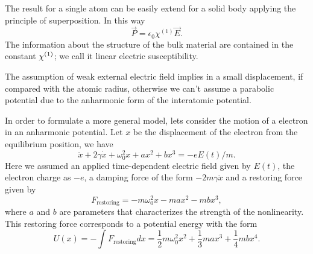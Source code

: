 The result for a single atom can be easily extend for a solid body applying the principle of  superposition. In this way
\begin{equation}
    \vec{P} = \epsilon_0\chi^{(1)}\vec{E}.
\end{equation}
The information about the structure of the bulk material are contained in the constant $\chi^{( 1)}$; we call it linear electric susceptibility.

The assumption of weak external electric field implies in a small displacement, if compared with the atomic radius, otherwise we can't assume a parabolic potential due to the anharmonic form of the interatomic potential. 

In order to formulate a more general model, lets consider the motion of a electron in an anharmonic potential. Let $x$ be the displacement of the electron from the equilibrium position, we have
\begin{equation}
    \ddot{x} + 2\gamma\dot{x} + \omega_0^2x+ax^2+bx^3 = -eE(t)/m.
    \label{eq:motion_equation_electron}
\end{equation}
Here we assumed an applied time-dependent electric field given by $E(t)$, the electron charge as $-e$, a damping force of the form $-2m\gamma\dot{x}$ and a restoring force given by
\begin{equation}
    F_\text{restoring} = -m\omega_0^2x -max^2 -mbx^3, 
\end{equation}
where $a$ and $b$ are parameters that characterizes the strength of the nonlinearity. This restoring force corresponds to a potential energy with the form 
\begin{equation}
    U(x) = -\int F_\text{restoring} dx = \frac{1}{2}m\omega_0^2x^2 +\frac{1}{3}max^3 +\frac{1}{4}mbx^4.
\end{equation}

